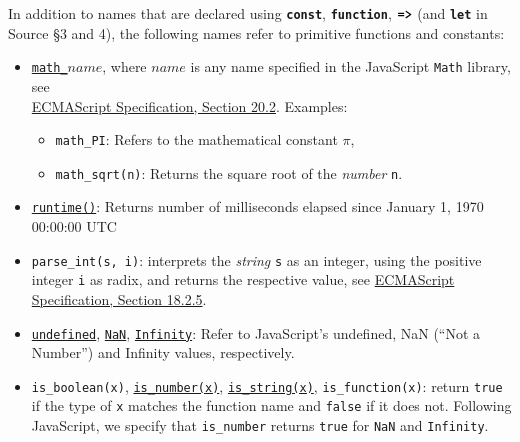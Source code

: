 

In addition to names that
are declared using \texttt{\textbf{const}}, \texttt{\textbf{function}},
$\texttt{\textbf{=>}}$ (and \texttt{\textbf{let}} in Source \S3 and 4), the following
names refer to primitive functions and constants:
\begin{itemize}
\item \href{https://sicp.comp.nus.edu.sg/chapters/6\#footnote-link-4}{\lstinline{math_}$\textit{name}$},
where $\textit{name}$ is any name specified in the
JavaScript
\texttt{Math} library, see\\
\href{https://www.ecma-international.org/ecma-262/9.0/index.html\#sec-math-object}{\color{DarkBlue}ECMAScript Specification, Section 20.2}. Examples:
\begin{itemize}
\item \verb#math_PI#: Refers to the mathematical constant $\pi$,
\item \verb#math_sqrt#\texttt{(n)}: Returns the square root of the \emph{number} \texttt{n}.
\end{itemize}
\item \texttt{\href{https://sicp.comp.nus.edu.sg/chapters/17\#ex_1.22}{runtime()}}: Returns number of milliseconds elapsed since January 1, 1970 00:00:00 UTC
\item \verb#parse_int#\texttt{(s, i)}:
interprets the \emph{string} \texttt{s} as an integer, using the positive integer \texttt{i} as radix, and returns the respective value,
see \href{https://www.ecma-international.org/ecma-262/9.0/index.html\#sec-parseint-string-radix}{\color{DarkBlue}ECMAScript Specification, Section 18.2.5}.
\item \href{https://sicp.comp.nus.edu.sg/chapters/4}{\texttt{undefined}},
  \texttt{\href{https://www.ecma-international.org/ecma-262/9.0/index.html\#sec-value-properties-of-the-global-object-nan}{\color{DarkBlue}NaN}}, \texttt{\href{https://www.ecma-international.org/ecma-262/9.0/index.html\#sec-value-properties-of-the-global-object-infinity}{\color{DarkBlue}Infinity}}: Refer to JavaScript's undefined,
NaN (``Not a Number'') and Infinity values, respectively.
\item \verb#is_boolean#\texttt{(x)}, \href{https://sicp.comp.nus.edu.sg/chapters/36}{\lstinline{is_number(x)}},
  \href{https://sicp.comp.nus.edu.sg/chapters/36}{\lstinline{is_string(x)}}, \verb#is_function#\texttt{(x)}:
        return \texttt{true} if the type of \texttt{x} matches the function name and \texttt{false} if it does not. Following
        JavaScript, we specify that \verb#is_number# returns \texttt{true} for \texttt{NaN} and \texttt{Infinity}.

\end{itemize}
